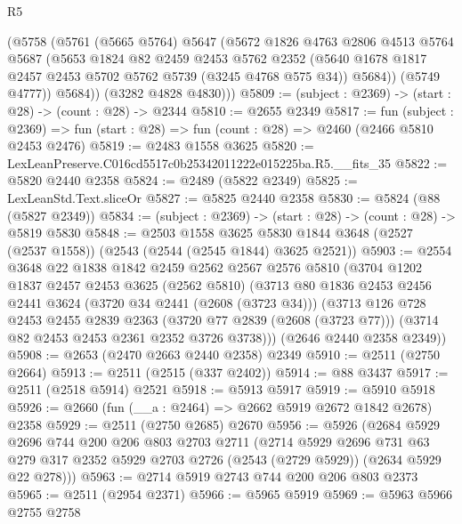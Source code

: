 \begin{lexlean}{R5}
\begin{coremodule}
          (@5758
            (@5761
              (@5665 @5764)
              @5647
              (@5672
                @1826
                @4763
                @2806
                @4513
                @5764
                @5687
                (@5653
                  @1824
                  @82
                  @2459
                  @2453
                  @5762
                  @2352
                  (@5640 @1678 @1817 @2457 @2453 @5702 @5762 @5739 (@3245 @4768 @575 @34))
                  @5684))
              (@5749 @4777))
            @5684))
        (@3282 @4828 @4830)))
@5809 := (subject : @2369) -> (start : @28) -> (count : @28) -> @2344
@5810 := @2655 @2349
@5817 := fun (subject : @2369) =>
  fun (start : @28) => fun (count : @28) => @2460 (@2466 @5810 @2453 @2476)
@5819 := @2483 @1558 @3625
@5820 := LexLeanPreserve.C016cd5517c0b25342011222e015225ba.R5.__fits_35
@5822 := @5820 @2440 @2358
@5824 := @2489 (@5822 @2349)
@5825 := LexLeanStd.Text.sliceOr
@5827 := @5825 @2440 @2358
@5830 := @5824 (@88 (@5827 @2349))
@5834 := (subject : @2369) -> (start : @28) -> (count : @28) -> @5819 @5830
@5848 := @2503
    @1558
    @3625
    @5830
    @1844
    @3648
    (@2527 (@2537 @1558))
    (@2543 (@2544 (@2545 @1844) @3625 @2521))
@5903 := @2554
    @3648
    @22
    @1838
    @1842
    @2459
    @2562
    @2567
    @2576
    @5810
    (@3704
      @1202
      @1837
      @2457
      @2453
      @3625
      (@2562 @5810)
      (@3713
        @80
        @1836
        @2453
        @2456
        @2441
        @3624
        (@3720 @34 @2441 (@2608 (@3723 @34)))
        (@3713
          @126
          @728
          @2453
          @2455
          @2839
          @2363
          (@3720 @77 @2839 (@2608 (@3723 @77)))
          (@3714 @82 @2453 @2453 @2361 @2352 @3726 @3738)))
      (@2646 @2440 @2358 @2349))
@5908 := @2653 (@2470 @2663 @2440 @2358) @2349
@5910 := @2511 (@2750 @2664)
@5913 := @2511 (@2515 (@337 @2402))
@5914 := @88 @3437
@5917 := @2511 (@2518 @5914) @2521
@5918 := @5913 @5917
@5919 := @5910 @5918
@5926 := @2660 (fun (__a : @2464) => @2662 @5919 @2672 @1842 @2678) @2358
@5929 := @2511 (@2750 @2685) @2670
@5956 := @5926
    (@2684
      @5929
      @2696
      @744
      @200
      @206
      @803
      @2703
      @2711
      (@2714
        @5929
        @2696
        @731
        @63
        @279
        @317
        @2352
        @5929
        @2703
        @2726
        (@2543 (@2729 @5929))
        (@2634 @5929 @22 @278)))
@5963 := @2714 @5919 @2743 @744 @200 @206 @803 @2373
@5965 := @2511 (@2954 @2371)
@5966 := @5965 @5919
@5969 := @5963 @5966 @2755 @2758

\end{coremodule}
\end{lexlean}
